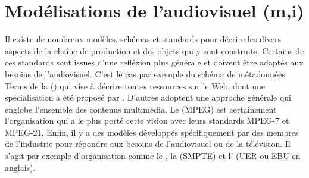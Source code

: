 \chapter{Modélisations de l'audiovisuel (m,i)}\label{chap:mav}
%
Il existe de nombreux modèles, schémas et standards pour décrire les divers aspects de la chaîne de production et des objets qui y sont construits. 
Certains de ces standards sont issues d'une refléxion plus générale et doivent être adaptés aux besoins de l'audiovisuel. 
C'est le cas par exemple du schéma de métadonnées Terms de la  (\cite{DCMIUsageBoard2010}) qui vise à décrire toutes ressources sur le Web, dont une spécialisation a été proposé par \cite{Hunter1999}.
D'autres adoptent une approche générale qui englobe l'ensemble des contenus multimédia.
Le  (MPEG) est certainement l'organisation qui a le plus porté cette vision avec leurs standards MPEG-7 et MPEG-21.
Enfin, il y a des modèles développés spécifiquement par des membres de l'industrie pour répondre aux besoins de l'audiovisuel ou de la télévision. 
Il s'agit par exemple d'organisation comme le , la  (SMPTE) et l' (UER ou EBU en anglais).

